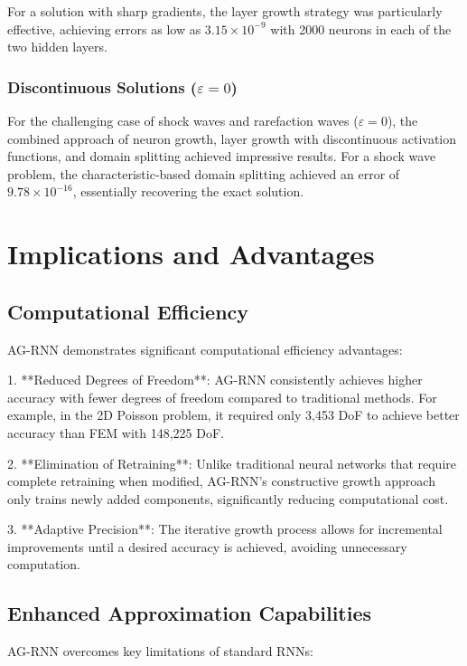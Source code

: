 \documentclass[11pt,a4paper]{article}
\begin{document}
For a solution with sharp gradients, the layer growth strategy was particularly effective, achieving errors as low as $3.15 \times 10^{-9}$ with 2000 neurons in each of the two hidden layers.

\subsubsection{Discontinuous Solutions ($\varepsilon = 0$)}

For the challenging case of shock waves and rarefaction waves ($\varepsilon = 0$), the combined approach of neuron growth, layer growth with discontinuous activation functions, and domain splitting achieved impressive results. For a shock wave problem, the characteristic-based domain splitting achieved an error of $9.78 \times 10^{-16}$, essentially recovering the exact solution.

\section{Implications and Advantages}

\subsection{Computational Efficiency}

AG-RNN demonstrates significant computational efficiency advantages:

1. **Reduced Degrees of Freedom**: AG-RNN consistently achieves higher accuracy with fewer degrees of freedom compared to traditional methods. For example, in the 2D Poisson problem, it required only 3,453 DoF to achieve better accuracy than FEM with 148,225 DoF.

2. **Elimination of Retraining**: Unlike traditional neural networks that require complete retraining when modified, AG-RNN's constructive growth approach only trains newly added components, significantly reducing computational cost.

3. **Adaptive Precision**: The iterative growth process allows for incremental improvements until a desired accuracy is achieved, avoiding unnecessary computation.

\subsection{Enhanced Approximation Capabilities}

AG-RNN overcomes key limitations of standard RNNs:
\end{document}
